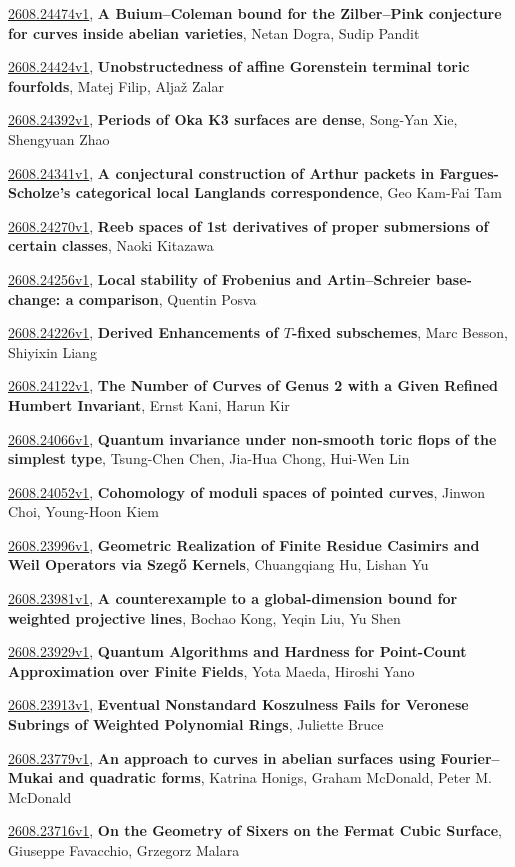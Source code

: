 \documentclass[9pt, a4paper]{article}
\theoremstyle{plain}
\theoremstyle{definition}
\theoremstyle{remark}
\newcommand{\arxiv}[3]{\href{https://arxiv.org/abs/#1}{#1}, \textbf{\textcolor{arxivblue}{#2}}, #3}
\begin{document}
\arxiv{2608.24474v1}{A Buium--Coleman bound for the Zilber--Pink conjecture for curves inside abelian varieties}{Netan Dogra, Sudip Pandit}

\arxiv{2608.24424v1}{Unobstructedness of affine Gorenstein terminal toric fourfolds}{Matej Filip, Aljaž Zalar}

\arxiv{2608.24392v1}{Periods of Oka K3 surfaces are dense}{Song-Yan Xie, Shengyuan Zhao}

\arxiv{2608.24341v1}{A conjectural construction of Arthur packets in Fargues-Scholze's categorical local Langlands correspondence}{Geo Kam-Fai Tam}

\arxiv{2608.24270v1}{Reeb spaces of 1st derivatives of proper submersions of certain classes}{Naoki Kitazawa}

\arxiv{2608.24256v1}{Local stability of Frobenius and Artin--Schreier base-change: a comparison}{Quentin Posva}

\arxiv{2608.24226v1}{Derived Enhancements of $T$-fixed subschemes}{Marc Besson, Shiyixin Liang}

\arxiv{2608.24122v1}{The Number of Curves of Genus 2 with a Given Refined Humbert Invariant}{Ernst Kani, Harun Kir}

\arxiv{2608.24066v1}{Quantum invariance under non-smooth toric flops of the simplest type}{Tsung-Chen Chen, Jia-Hua Chong, Hui-Wen Lin}

\arxiv{2608.24052v1}{Cohomology of moduli spaces of pointed curves}{Jinwon Choi, Young-Hoon Kiem}

\arxiv{2608.23996v1}{Geometric Realization of Finite Residue Casimirs and Weil Operators via Szegő Kernels}{Chuangqiang Hu, Lishan Yu}

\arxiv{2608.23981v1}{A counterexample to a global-dimension bound for weighted projective lines}{Bochao Kong, Yeqin Liu, Yu Shen}

\arxiv{2608.23929v1}{Quantum Algorithms and Hardness for Point-Count Approximation over Finite Fields}{Yota Maeda, Hiroshi Yano}

\arxiv{2608.23913v1}{Eventual Nonstandard Koszulness Fails for Veronese Subrings of Weighted Polynomial Rings}{Juliette Bruce}

\arxiv{2608.23779v1}{An approach to curves in abelian surfaces using Fourier--Mukai and quadratic forms}{Katrina Honigs, Graham McDonald, Peter M. McDonald}

\arxiv{2608.23716v1}{On the Geometry of Sixers on the Fermat Cubic Surface}{Giuseppe Favacchio, Grzegorz Malara}
\end{document}
